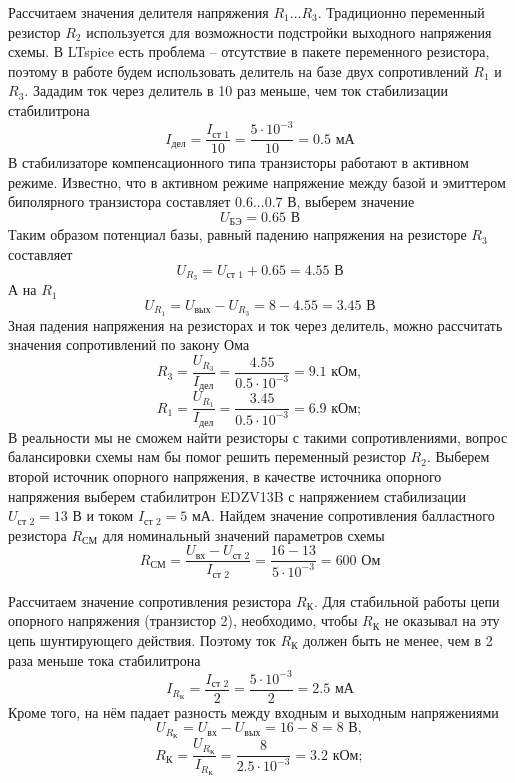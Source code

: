 \documentclass[a4paper, 12pt]{article}
\begin{document}
    Рассчитаем значения делителя напряжения $R_1$...$R_3$.
    Традиционно переменный резистор $R_2$ используется для
    возможности подстройки выходного напряжения схемы.
    В LTspice есть проблема -- отсутствие в пакете переменного
    резистора, поэтому в работе будем использовать делитель на
    базе двух сопротивлений $R_1$ и $R_3$.
    Зададим ток через делитель в 10 раз меньше,
    чем ток стабилизации стабилитрона
    $$
    I_{\text{дел}}=\dfrac{I_{\text{ст 1}}}{10}=\dfrac{5\cdot10^{-3}}{10}=0.5 \text{ мА} 
    $$
    В стабилизаторе компенсационного типа транзисторы работают
    в активном режиме. Известно, что в активном режиме напряжение
    между базой и эмиттером биполярного транзистора составляет
    $0.6$...$0.7$ В, выберем значение
    $$
    U_{\text{БЭ}}=0.65 \text{ В}
    $$
    Таким образом потенциал базы,
    равный падению напряжения на
    резисторе $R_3$ составляет
    $$
    U_{R_3}=U_{\text{ст 1}}+0.65=4.55\text{ В}
    $$
    А на $R_1$
    $$
    U_{R_1}=U_{\text{вых}}-U_{R_3}=8-4.55=3.45\text{ В}
    $$
    Зная падения напряжения на резисторах и ток через делитель,
    можно рассчитать значения сопротивлений по закону Ома
    $$
    R_3=\dfrac{U_{R_3}}{I_{\text{дел}}}=\dfrac{4.55}{0.5\cdot10^{-3}}=9.1\text{ кОм},
    $$
    $$
    R_1=\dfrac{U_{R_1}}{I_{\text{дел}}}=\dfrac{3.45}{0.5\cdot10^{-3}}=6.9\text{ кОм};
    $$
    В реальности мы не сможем найти резисторы
    с такими сопротивлениями, вопрос балансировки
    схемы нам бы помог решить переменный резистор $R_2$.
    Выберем второй источник опорного напряжения,
    в качестве источника опорного напряжения выберем стабилитрон
    EDZV13B с напряжением стабилизации $U_{\text{ст 2}}=13$ В
    и током $I_{\text{ст 2}}=5$ мА.
    Найдем значение сопротивления балластного
    резистора $R_{\text{СМ}}$ для номинальный значений параметров схемы
    $$
    R_{\text{СМ}}=\dfrac{U_{\text{вх}}-U_{\text{ст 2}}}{I_\text{ст 2}}=\dfrac{16-13}{5\cdot10^{-3}}=600\text{ Ом}
    $$


    Рассчитаем значение сопротивления резистора $R_\text{К}$.
    Для стабильной работы цепи опорного напряжения (транзистор 2),
    необходимо, чтобы $R_\text{К}$ не оказывал на эту цепь шунтирующего действия.
    Поэтому ток $R_\text{К}$ должен быть не менее, чем в 2 раза меньше тока
    стабилитрона
    $$
    I_{R_\text{К}}=\dfrac{I_{\text{ст 2}}}{2}=\dfrac{5\cdot10^{-3}}{2}=2.5\text{ мА}
    $$
    Кроме того, на нём падает разность между входным
    и выходным напряжениями
    $$
    U_{R_\text{К}}=U_{\text{вх}}-U_{\text{вых}}=16-8=8\text{ В},
    $$
    $$
    R_\text{К}=\dfrac{U_{R_\text{К}}}{I_{R_\text{К}}}=\dfrac{8}{2.5\cdot10^{-3}}=3.2\text{ кОм};
    $$
\end{document}
